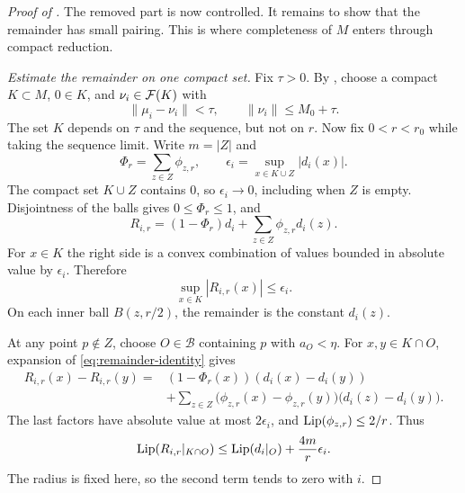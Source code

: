 \begin{proof}[Proof of ]
The removed part is now controlled. It remains to show that the
remainder has small pairing. This is where completeness of \(M\)
enters through compact reduction.

\medskip
\noindent\emph{Estimate the remainder on one compact set.}
Fix \(\tau>0\). By , choose a compact
\(K\subset M\), \(0\in K\), and \(\nu_i\in\mathcal F(K)\) with
\[
 \|\mu_i-\nu_i\|<\tau,\qquad
 \|\nu_i\|\le M_0+\tau.
\]
The set \(K\) depends on \(\tau\) and the sequence, but not on \(r\).
Now fix \(0<r<r_0\) while taking the sequence limit. Write \(m=|Z|\)
and
\[
 \Phi_r=\sum_{z\in Z}\phi_{z,r},\qquad
 \epsilon_i=\sup_{x\in K\cup Z}|d_i(x)|.
\]
The compact set \(K\cup Z\) contains \(0\), so
\(\epsilon_i\to0\), including when \(Z\) is empty.
Disjointness of the balls gives \(0\le\Phi_r\le1\), and
\begin{equation}
\label{eq:remainder-identity}
 R_{i,r}=(1-\Phi_r)d_i+\sum_{z\in Z}\phi_{z,r}d_i(z).
\end{equation}
For \(x\in K\) the right side is a convex combination of values
bounded in absolute value by \(\epsilon_i\). Therefore
\begin{equation}
\label{eq:remainder-sup}
 \sup_{x\in K}|R_{i,r}(x)|\le\epsilon_i.
\end{equation}
On each inner ball \(B(z,r/2)\), the remainder is the constant
\(d_i(z)\).

At any point \(p\notin Z\), choose \(O\in\mathcal B\) containing
\(p\) with \(a_O<\eta\). For \(x,y\in K\cap O\), expansion of
\eqref{eq:remainder-identity} gives
\begin{align*}
 R_{i,r}(x)-R_{i,r}(y)
 ={}&(1-\Phi_r(x))(d_i(x)-d_i(y))\\
 &+\sum_{z\in Z}
   \bigl(\phi_{z,r}(x)-\phi_{z,r}(y)\bigr)
   \bigl(d_i(z)-d_i(y)\bigr).
\end{align*}
The last factors have absolute value at most \(2\epsilon_i\), and
\(\operatorname{Lip}(\phi_{z,r})\le2/r\). Thus
\begin{equation}
\label{eq:local-remainder}
 \operatorname{Lip}(R_{i,r}|_{K\cap O})
 \le \operatorname{Lip}(d_i|_O)+\frac{4m}{r}\epsilon_i.
\end{equation}
The radius is fixed here, so the second term tends to zero with \(i\).


\end{proof}
